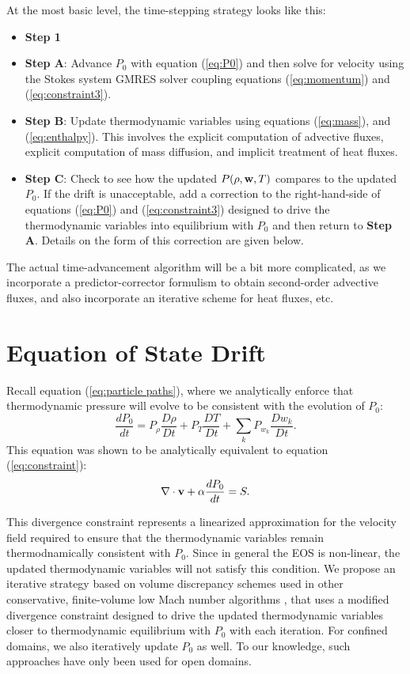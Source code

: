 \documentclass[final]{siamltex}
\def\vb {{\bf v}}
\def\wb {{\bf w}}
\begin{document}
At the most basic level, the time-stepping strategy looks like this:\\
\begin{itemize}
\item {\bf Step 1}


\item {\bf Step A}: Advance $P_0$ with equation (\ref{eq:P0}) and 
then solve for velocity using the Stokes system GMRES solver coupling equations 
(\ref{eq:momentum}) and (\ref{eq:constraint3}).\\
\item {\bf Step B}: Update thermodynamic variables using equations (\ref{eq:mass}), 
and (\ref{eq:enthalpy}).  This involves the explicit computation of advective fluxes,
explicit computation of mass diffusion, and implicit treatment of heat fluxes.\\
\item {\bf Step C}: Check to see how the updated $P(\rho,\wb,T)$ compares to the 
updated $P_0$.  If the drift 
is unacceptable, add a correction to the right-hand-side of equations
(\ref{eq:P0}) and (\ref{eq:constraint3})
designed to drive the thermodynamic variables into equilibrium with 
$P_0$ and then return to {\bf Step A}.  Details on the form of this 
correction are given below.\\
\end{itemize}
The actual time-advancement algorithm will be a bit more complicated, as we 
incorporate a predictor-corrector formulism to obtain second-order advective 
fluxes, and also incorporate an iterative scheme for heat fluxes, etc.

\section{Equation of State Drift}
Recall equation (\ref{eq:particle paths}), where we analytically enforce that
thermodynamic pressure will evolve to be consistent with the evolution of $P_0$:
\begin{equation}
\frac{dP_0}{dt} = P_\rho\frac{D\rho}{Dt} + P_T\frac{DT}{Dt} + \sum_kP_{w_k}\frac{Dw_k}{Dt}.
\end{equation}
This equation was shown to be analytically equivalent to equation (\ref{eq:constraint}):
\begin{equation}
\nabla\cdot\vb + \alpha\frac{dP_0}{dt} = S.
\end{equation}

This divergence constraint represents a linearized approximation for the velocity 
field required to ensure that the thermodynamic variables remain thermodnamically
consistent with $P_0$.  Since in general the EOS is non-linear, the updated 
thermodynamic variables will not
satisfy this condition.  We propose an iterative strategy based on
volume discrepancy schemes used
in other conservative, finite-volume low Mach number algorithms
\cite{Pember:1998,XRB}, that
uses a modified divergence constraint designed to drive the updated 
thermodynamic variables closer to thermodynamic equilibrium with $P_0$ with each iteration.
For confined domains, we also iteratively update $P_0$ as well.  To our knowledge,
such approaches have only been used for open domains.\\
\end{document}
